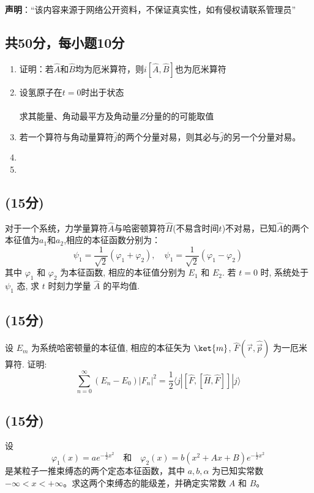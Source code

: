
\textbf{声明}：“该内容来源于网络公开资料，不保证真实性，如有侵权请联系管理员”

\subsection{共50分，每小题10分}
\begin{enumerate}
\item 证明：若$\hat{A}$和$\hat{B}$均为厄米算符，则$i[\hat{A},\hat{B}]$也为厄米算符
\item 设氢原子在$t=0$时出于状态\\\\
求其能量、角动最平方及角动量$Z$分量的的可能取值
\item 若一个算符与角动量算符$\hat{j}$的两个分量对易，则其必与$\hat{j}$的另一个分量对易。
\item 
\item 
\end{enumerate}
\subsection{(15分)}
对于一个系统，力学量算符$\hat{A}$与哈密顿算符$\hat{H}$(不易含时间$t$)不对易，已知$\hat{A}$的两个本征值为$a_1$和$a_2$,相应的本征函数分别为：
$$\psi_1 = \frac{1}{\sqrt{2}} (\varphi_1 + \varphi_2), \quad \psi_1 = \frac{1}{\sqrt{2}} (\varphi_1 - \varphi_2)~$$
其中 $\varphi_1$ 和 $\varphi_2$ 为本征函数, 相应的本征值分别为 $E_1$ 和 $E_2$. 若 $t = 0$ 时, 系统处于 $\psi_1$ 态, 求 $t$ 时刻力学量 $\hat{A}$ 的平均值.
\subsection{(15分)}
设 $E_m$ 为系统哈密顿量的本征值, 相应的本征矢为 $\ket{m}$, $\hat{F}(\vec{r}, \hat{\vec{p}})$ 为一厄米算符. 证明:
\[
\sum^\infty_{n=0}(E_n - E_0) |F_n|^2 =\frac{1}{2}\langle j |[\hat{F}, [\hat{H}, \hat{F}]] |j \rangle ~
\]
\subsection{(15分)}

设
\[
\varphi_1(x) = ae^{-\frac{1}{2}x^2} \quad \text{和} \quad \varphi_2(x) = b(x^2 + Ax + B)e^{-\frac{1}{2}x^2}~
\]
是某粒子一推束缚态的两个定态本征函数，其中 $a, b, \alpha$ 为已知实常数$-\infty < x < +\infty$。求这两个束缚态的能级差，并确定实常数 $A$ 和 $B$。
